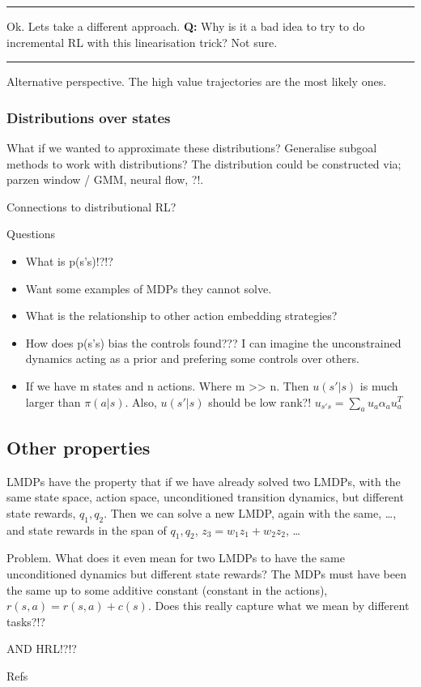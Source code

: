 \begin{center}\rule{0.5\linewidth}{\linethickness}\end{center}

Ok. Lets take a different approach. \textbf{Q:} Why is it a bad idea to
try to do incremental RL with this linearisation trick? Not sure.

\begin{center}\rule{0.5\linewidth}{\linethickness}\end{center}

Alternative perspective. The high value trajectories are the most likely
ones.

\hypertarget{distributions-over-states}{%
\subsubsection{Distributions over states}\label{distributions-over-states}}

What if we wanted to approximate these distributions? Generalise subgoal
methods to work with distributions? The distribution could be
constructed via; parzen window / GMM, neural flow, ?!.

Connections to distributional RL?

Questions

\begin{itemize}
\tightlist
\item
  What is p(s'\textbar{}s)!?!?
\item
  Want some examples of MDPs they cannot solve.
\item
  What is the relationship to other action embedding strategies?
\item
  How does p(s'\textbar{}s) bias the controls found??? I can imagine the
  unconstrained dynamics acting as a prior and prefering some controls
  over others.
\item
  If we have m states and n actions. Where m
  \textgreater{}\textgreater{} n. Then \(u(s'|s)\) is much larger than
  \(\pi(a|s)\). Also, \(u(s'|s)\) should be low rank?!
  \(u_{s's} = \sum_a u_a \alpha_a u_a^T\)
\end{itemize}

\hypertarget{other-properties}{%
\subsection{Other properties}\label{other-properties}}

LMDPs have the property that if we have already solved two LMDPs, with
the same state space, action space, unconditioned transition dynamics,
but different state rewards, \(q_1, q_2\). Then we can solve a new LMDP,
again with the same, \ldots{}, and state rewards in the span of
\(q_1, q_2\), \(z_3 = w_1 z_1 + w_2 z_2\), \ldots{}

Problem. What does it even mean for two LMDPs to have the same
unconditioned dynamics but different state rewards? The MDPs must have
been the same up to some additive constant (constant in the actions),
\(r(s, a)=r(s, a) + c(s)\). Does this really capture what we mean by
different tasks?!?

AND HRL!?!?

Refs \cite{Todorov2006,Todorov2009,Zhong,Zhonga,Dvijotham,Wozabal}
